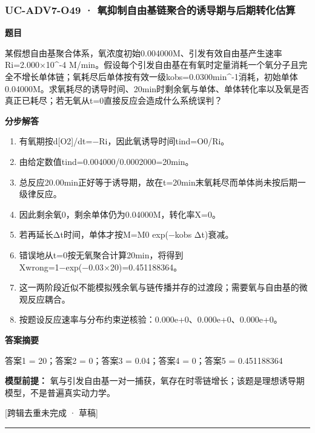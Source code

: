 \documentclass[UTF8,11pt,a4paper]{ctexart}
\begin{document}
\subsubsection*{UC-ADV7-O49 · 氧抑制自由基链聚合的诱导期与后期转化估算}
\noindent\textbf{题目}\par
某假想自由基聚合体系，氧浓度初始0.004000M、引发有效自由基产生速率Ri=2.000×10\textasciicircum{}-4 M/min。假设每个引发自由基在有氧时定量消耗一个氧分子且完全不增长单体链；氧耗尽后单体按有效一级kobs=0.0300min\textasciicircum{}-1消耗，初始单体0.04000M。求氧耗尽的诱导时间、20min时剩余氧与单体、单体转化率以及氧是否真正已耗尽；若无氧从t=0直接反应会造成什么系统误判？\par
\medskip\noindent\textbf{分步解答}
\begin{enumerate}
\item 有氧期按d[O2]/dt=−Ri，因此氧诱导时间tind=O0/Ri。
\item 由给定数值tind=0.004000/0.0002000=20min。
\item 总反应20.00min正好等于诱导期，故在t=20min末氧耗尽而单体尚未按后期一级律反应。
\item 因此剩余氧0，剩余单体仍为0.04000M，转化率X=0。
\item 若再延长Δt时间，单体才按M=M0 exp(−kobs Δt)衰减。
\item 错误地从t=0按无氧聚合计算20min，将得到Xwrong=1−exp(−0.03×20)=0.451188364。
\item 这一两阶段近似不能模拟残余氧与链传播并存的过渡段；需要氧与自由基的微观反应耦合。
\item 按题设反应速率与分布约束逆核验：0.000e+0、0.000e+0、0.000e+0。
\end{enumerate}
\noindent\textbf{答案摘要}\par
答案1 = 20；答案2 = 0；答案3 = 0.04；答案4 = 0；答案5 = 0.451188364\par
\noindent\textbf{模型前提：}
氧与引发自由基一对一捕获，氧存在时零链增长；该题是理想诱导期模型，不是普遍真实动力学。\par
\noindent\textcolor{red!65!black}{[跨辑去重未完成 · 草稿]} \par
\medskip\hrule\medskip
{}
\end{document}
